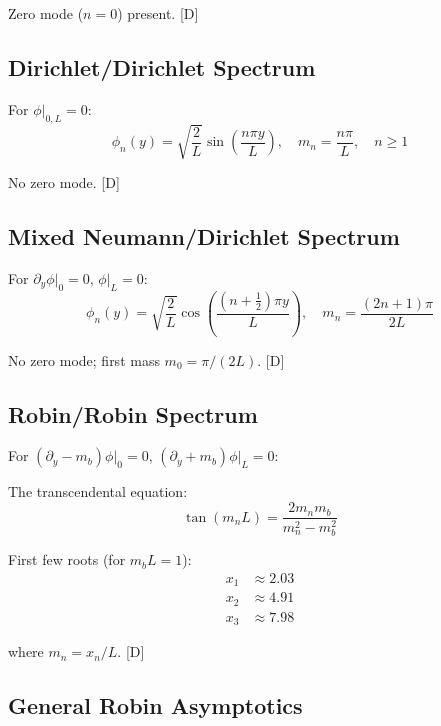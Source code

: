 \documentclass[11pt,a4paper]{article}
\newcommand{\tagD}{\textcolor{blue!70!black}{[D]}}
\begin{document}
Zero mode ($n=0$) present. \tagD

\subsection{Dirichlet/Dirichlet Spectrum}

For $\phi|_{0,L} = 0$:
\begin{equation}
\label{eq:spec-DD}
\phi_n(y) = \sqrt{\frac{2}{L}} \sin\left(\frac{n\pi y}{L}\right), \quad m_n = \frac{n\pi}{L}, \quad n \geq 1
\end{equation}

No zero mode. \tagD

\subsection{Mixed Neumann/Dirichlet Spectrum}

For $\partial_y\phi|_0 = 0$, $\phi|_L = 0$:
\begin{equation}
\label{eq:spec-ND}
\phi_n(y) = \sqrt{\frac{2}{L}} \cos\left(\frac{(n+\frac{1}{2})\pi y}{L}\right), \quad m_n = \frac{(2n+1)\pi}{2L}
\end{equation}

No zero mode; first mass $m_0 = \pi/(2L)$. \tagD

\subsection{Robin/Robin Spectrum}

For $(\partial_y - m_b)\phi|_0 = 0$, $(\partial_y + m_b)\phi|_L = 0$:

The transcendental equation:
\begin{equation}
\label{eq:spec-RR-trans}
\tan(m_n L) = \frac{2 m_n m_b}{m_n^2 - m_b^2}
\end{equation}

First few roots (for $m_b L = 1$):
\begin{align}
\label{eq:spec-RR-roots}
x_1 &\approx 2.03 \\
x_2 &\approx 4.91 \\
x_3 &\approx 7.98
\end{align}

where $m_n = x_n/L$. \tagD

\subsection{General Robin Asymptotics}
\end{document}
